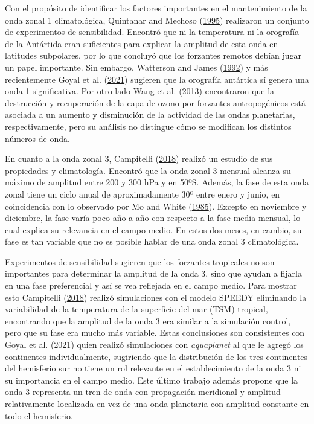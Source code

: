 \documentclass[12pt,oneside,a4paper]{reedthesis}
\begin{document}
Con el propósito de identificar los factores importantes en el mantenimiento de la onda zonal 1 climatológica, Quintanar and Mechoso (\protect\hyperlink{ref-quintanar1995a}{1995}) realizaron un conjunto de experimentos de sensibilidad.
Encontró que ni la temperatura ni la orografía de la Antártida eran suficientes para explicar la amplitud de esta onda en latitudes subpolares, por lo que concluyó que los forzantes remotos debían jugar un papel importante.
Sin embargo, Watterson and James (\protect\hyperlink{ref-watterson1992}{1992}) y más recientemente Goyal et al. (\protect\hyperlink{ref-goyal2021a}{2021}) sugieren que la orografía antártica sí genera una onda 1 significativa.
Por otro lado Wang et al. (\protect\hyperlink{ref-wang2013}{2013}) encontraron que la destrucción y recuperación de la capa de ozono por forzantes antropogénicos está asociada a un aumento y disminución de la actividad de las ondas planetarias, respectivamente, pero su análisis no distingue cómo se modifican los distintos números de onda.

En cuanto a la onda zonal 3, Campitelli (\protect\hyperlink{ref-campitelli2018b}{2018}) realizó un estudio de sus propiedades y climatología.
Encontró que la onda zonal 3 mensual alcanza su máximo de amplitud entre 200 y 300 hPa y en 50ºS.
Además, la fase de esta onda zonal tiene un ciclo anual de aproximadamente 30º entre enero y junio, en coincidencia con lo observado por Mo and White (\protect\hyperlink{ref-mo1985}{1985}).
Excepto en noviembre y diciembre, la fase varía poco año a año con respecto a la fase media mensual, lo cual explica su relevancia en el campo medio.
En estos dos meses, en cambio, su fase es tan variable que no es posible hablar de una onda zonal 3 climatológica.

Experimentos de sensibilidad sugieren que los forzantes tropicales no son importantes para determinar la amplitud de la onda 3, sino que ayudan a fijarla en una fase preferencial y así se vea reflejada en el campo medio.
Para mostrar esto Campitelli (\protect\hyperlink{ref-campitelli2018b}{2018}) realizó simulaciones con el modelo SPEEDY eliminando la variabilidad de la temperatura de la superficie del mar (TSM) tropical, encontrando que la amplitud de la onda 3 era similar a la simulación control, pero que su fase era mucho más variable.
Estas conclusiones son consistentes con Goyal et al. (\protect\hyperlink{ref-goyal2021a}{2021}) quien realizó simulaciones con \emph{aquaplanet} al que le agregó los continentes individualmente, sugiriendo que la distribución de los tres continentes del hemisferio sur no tiene un rol relevante en el establecimiento de la onda 3 ni su importancia en el campo medio.
Este último trabajo además propone que la onda 3 representa un tren de onda con propagación meridional y amplitud relativamente localizada en vez de una onda planetaria con amplitud constante en todo el hemisferio.
\end{document}
